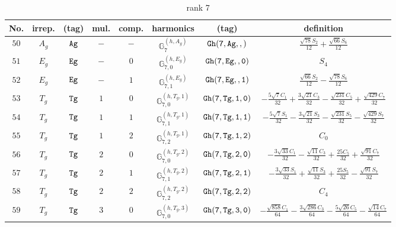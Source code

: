 \documentclass[fleqn,8pt]{jsarticle}
\begin{document}
\begin{table}[ht!]
\begin{center}
\caption{rank 7}
\renewcommand{\arraystretch}{1.3}
\begin{tabular}{cccccccc} \hline \hline
No. & irrep. & (tag) & mul. & comp. & harmonics & (tag) & definition \\ \hline
$ 50 $ & $ A_{g} $ & $ {\tt Ag} $ & $ - $ & $ - $ & $ \mathbb{G}_{7}^{(h,A_{g})} $ & $ {\tt Gh(7,Ag,,)} $ & $ \frac{\sqrt{78} S_{2}}{12} + \frac{\sqrt{66} S_{6}}{12} $ \\
$ 51 $ & $ E_{g} $ & $ {\tt Eg} $ & $ - $ & $ 0 $ & $ \mathbb{G}_{7,0}^{(h,E_{g})} $ & $ {\tt Gh(7,Eg,,0)} $ & $ S_{4} $ \\
$ 52 $ & $ E_{g} $ & $ {\tt Eg} $ & $ - $ & $ 1 $ & $ \mathbb{G}_{7,1}^{(h,E_{g})} $ & $ {\tt Gh(7,Eg,,1)} $ & $ \frac{\sqrt{66} S_{2}}{12} - \frac{\sqrt{78} S_{6}}{12} $ \\
$ 53 $ & $ T_{g} $ & $ {\tt Tg} $ & $ 1 $ & $ 0 $ & $ \mathbb{G}_{7,0}^{(h,T_{g},1)} $ & $ {\tt Gh(7,Tg,1,0)} $ & $ - \frac{5 \sqrt{7} C_{1}}{32} + \frac{3 \sqrt{21} C_{3}}{32} - \frac{\sqrt{231} C_{5}}{32} + \frac{\sqrt{429} C_{7}}{32} $ \\
$ 54 $ & $ T_{g} $ & $ {\tt Tg} $ & $ 1 $ & $ 1 $ & $ \mathbb{G}_{7,1}^{(h,T_{g},1)} $ & $ {\tt Gh(7,Tg,1,1)} $ & $ - \frac{5 \sqrt{7} S_{1}}{32} - \frac{3 \sqrt{21} S_{3}}{32} - \frac{\sqrt{231} S_{5}}{32} - \frac{\sqrt{429} S_{7}}{32} $ \\
$ 55 $ & $ T_{g} $ & $ {\tt Tg} $ & $ 1 $ & $ 2 $ & $ \mathbb{G}_{7,2}^{(h,T_{g},1)} $ & $ {\tt Gh(7,Tg,1,2)} $ & $ C_{0} $ \\
$ 56 $ & $ T_{g} $ & $ {\tt Tg} $ & $ 2 $ & $ 0 $ & $ \mathbb{G}_{7,0}^{(h,T_{g},2)} $ & $ {\tt Gh(7,Tg,2,0)} $ & $ - \frac{3 \sqrt{33} C_{1}}{32} - \frac{\sqrt{11} C_{3}}{32} + \frac{25 C_{5}}{32} + \frac{\sqrt{91} C_{7}}{32} $ \\
$ 57 $ & $ T_{g} $ & $ {\tt Tg} $ & $ 2 $ & $ 1 $ & $ \mathbb{G}_{7,1}^{(h,T_{g},2)} $ & $ {\tt Gh(7,Tg,2,1)} $ & $ - \frac{3 \sqrt{33} S_{1}}{32} + \frac{\sqrt{11} S_{3}}{32} + \frac{25 S_{5}}{32} - \frac{\sqrt{91} S_{7}}{32} $ \\
$ 58 $ & $ T_{g} $ & $ {\tt Tg} $ & $ 2 $ & $ 2 $ & $ \mathbb{G}_{7,2}^{(h,T_{g},2)} $ & $ {\tt Gh(7,Tg,2,2)} $ & $ C_{4} $ \\
$ 59 $ & $ T_{g} $ & $ {\tt Tg} $ & $ 3 $ & $ 0 $ & $ \mathbb{G}_{7,0}^{(h,T_{g},3)} $ & $ {\tt Gh(7,Tg,3,0)} $ & $ - \frac{\sqrt{858} C_{1}}{64} - \frac{3 \sqrt{286} C_{3}}{64} - \frac{5 \sqrt{26} C_{5}}{64} - \frac{\sqrt{14} C_{7}}{64} $ \\

\end{tabular}
\end{center}
\end{table}
\end{document}
